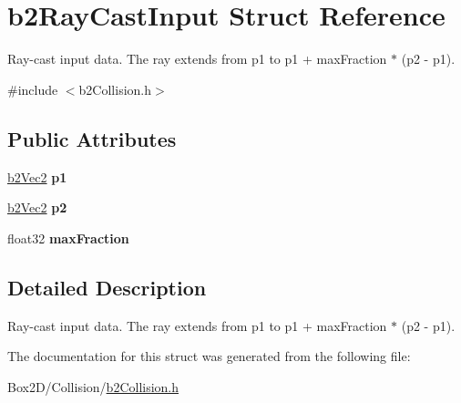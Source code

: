 \hypertarget{structb2_ray_cast_input}{}\section{b2\+Ray\+Cast\+Input Struct Reference}
\label{structb2_ray_cast_input}


Ray-\/cast input data. The ray extends from p1 to p1 + max\+Fraction $\ast$ (p2 -\/ p1).  




{\ttfamily \#include $<$b2\+Collision.\+h$>$}

\subsection*{Public Attributes}
\begin{DoxyCompactItemize}
\item 
\mbox{\label{structb2_ray_cast_input_a7254a7062422833b1124fa464ab4caf3}} 
\hyperlink{structb2_vec2}{b2\+Vec2} {\bfseries p1}
\item 
\mbox{\label{structb2_ray_cast_input_a850102c843469781a3a627c871043d0b}} 
\hyperlink{structb2_vec2}{b2\+Vec2} {\bfseries p2}
\item 
\mbox{\label{structb2_ray_cast_input_acb5c88e0ef2c3716a1334611522ab0b2}} 
float32 {\bfseries max\+Fraction}
\end{DoxyCompactItemize}


\subsection{Detailed Description}
Ray-\/cast input data. The ray extends from p1 to p1 + max\+Fraction $\ast$ (p2 -\/ p1). 

The documentation for this struct was generated from the following file\+:\begin{DoxyCompactItemize}
\item 
Box2\+D/\+Collision/\hyperlink{b2_collision_8h}{b2\+Collision.\+h}\end{DoxyCompactItemize}
